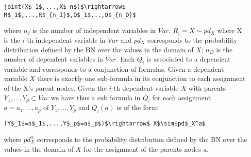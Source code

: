 \documentclass[letterpaper]{article}
\theoremstyle{plain}
\theoremstyle{definition}
\theoremstyle{remark}
\theoremstyle{definition}
\begin{document}
\begin{lstlisting}[mathescape=true]
joint(X$_1$,...,X$_n$)$\rightarrow$ R$_1$,...,R$_{n_I}$,Q$_1$...,Q$_{n_D}$
  \end{lstlisting}
where 
$n_I$ is the number of independent variables in $Var$. $R_i= X \sim pd_X$ where X is the $i$-th independent variable in $Var$ and $pd_X$ corresponds to the probability distribution defined by the BN over the values in the domain of $X$;
$n_D$ is the number of dependent variables in $Var$. Each $Q_i$ is associated to a dependent variable and corresponds to a conjunction of formulas. Given a dependent variable $X$ there is exactly one sub-formula in its conjunction to each assignment of the X's parent nodes. Given the $i$-th dependent variable $X$ with parents $Y_1, \ldots, Y_p \subset Var$ we have thus a sub formula in $Q_i$ for each assignment $a=a_1,\ldots,a_p$ of $Y_1, \ldots, Y_p$ and $Q_i(a)$ is of the form:
\begin{lstlisting}[mathescape=true]
(Y$_1$=a$_1$,...,Y$_p$=a$_p$)$\rightarrow$ X$\sim$pd$_X^a$
\end{lstlisting}
where $ pd_X^a$ corresponds to the probability distribution defined by the BN over the values in the domain of $X$ for the assignment of the parents nodes $a$.
\end{document}
